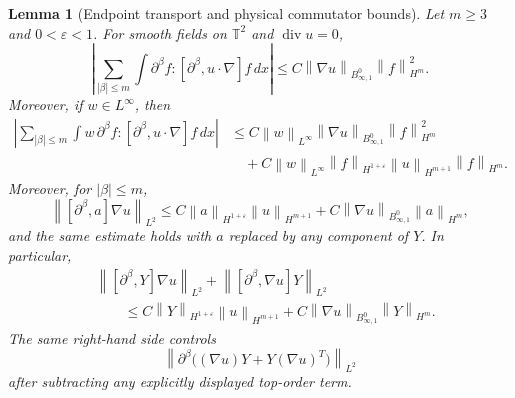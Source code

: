 \documentclass[11pt]{article}
\newtheorem{lemma}{Lemma}[section]
\newcommand{\T}{\mathbb T}
\newcommand{\divv}{\operatorname{div}}
\newcommand{\eps}{\varepsilon}
\newcommand{\norm}[1]{\left\lVert #1\right\rVert}
\newcommand{\Besov}{B^0_{\infty,1}}
\begin{document}
\begin{lemma}[Endpoint transport and physical commutator bounds]
\label{lem:physical-commutator}
Let \(m\ge3\) and \(0<\eps<1\).  For smooth fields on \(\T^2\) and
\(\divv u=0\),
\[
  \left|
  \sum_{|\beta|\le m}
  \int \partial^\beta f:
  [\partial^\beta,u\cdot\nabla]f\,dx
  \right|
  \le C\norm{\nabla u}_{\Besov}\norm{f}_{H^m}^2.
  \label{eq:pointwise-transport-commutator}
\]
Moreover, if \(w\in L^\infty\), then
\[
\begin{aligned}
  \left|
  \sum_{|\beta|\le m}
  \int w\,\partial^\beta f:
  [\partial^\beta,u\cdot\nabla]f\,dx
  \right|
  &\le C\norm{w}_{L^\infty}
  \norm{\nabla u}_{\Besov}\norm{f}_{H^m}^2 \\
  &\quad
  +C\norm{w}_{L^\infty}\norm{f}_{H^{1+\eps}}
    \norm{u}_{H^{m+1}}\norm{f}_{H^m}.
\end{aligned}
  \label{eq:weighted-transport-commutator}
\]
Moreover, for \(|\beta|\le m\),
\[
  \norm{[\partial^\beta,a]\nabla u}_{L^2}
  \le C\norm{a}_{H^{1+\eps}}\norm{u}_{H^{m+1}}
       +C\norm{\nabla u}_{\Besov}\norm{a}_{H^m},
  \label{eq:kp-a-u}
\]
and the same estimate holds with \(a\) replaced by any component of \(Y\).  In
particular,
\[
\begin{aligned}
  &\norm{[\partial^\beta,Y]\nabla u}_{L^2}
  +\norm{[\partial^\beta,\nabla u]Y}_{L^2}  \\
  &\qquad\le
  C\norm{Y}_{H^{1+\eps}}\norm{u}_{H^{m+1}}
  +C\norm{\nabla u}_{\Besov}\norm{Y}_{H^m} .
\end{aligned}
  \label{eq:kp-Y-u}
\]
The same right-hand side controls
\[
  \norm{\partial^\beta\bigl((\nabla u)Y+Y(\nabla u)^T\bigr)}_{L^2}
\]
after subtracting any explicitly displayed top-order term.
\end{lemma}
\end{document}
